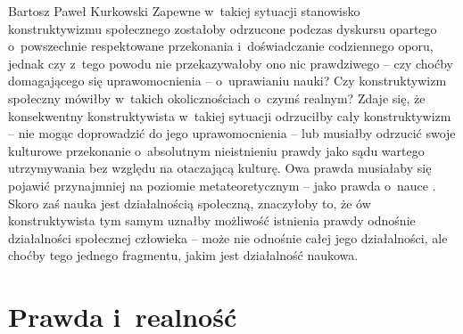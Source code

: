 \begin{artplenv}{Bartosz Paweł Kurkowski}
Zapewne w~takiej sytuacji stanowisko konstruktywizmu społecznego zostałoby odrzucone podczas dyskursu opartego o~powszechnie
respektowane przekonania i~doświadczanie codziennego oporu, jednak czy z~tego powodu nie przekazywałoby ono nic
prawdziwego -- czy choćby domagającego się uprawomocnienia -- o~uprawianiu nauki? Czy konstruktywizm społeczny
mówiłby w~takich okolicznościach o~czymś realnym? Zdaje się, że konsekwentny konstruktywista w~takiej sytuacji odrzuciłby cały
konstruktywizm -- nie mogąc doprowadzić do jego uprawomocnienia -- lub musiałby odrzucić swoje kulturowe
przekonanie o~absolutnym nieistnieniu prawdy jako sądu wartego utrzymywania bez względu na otaczającą kulturę. Owa prawda musiałaby
się pojawić przynajmniej na poziomie metateoretycznym -- jako prawda o~nauce
\parencite[s.~134]{hardt_studia_2013}.
Skoro zaś nauka jest działalnością społeczną, znaczyłoby to, że ów konstruktywista tym samym uznałby
możliwość istnienia prawdy odnośnie działalności społecznej człowieka -- może nie odnośnie całej jego działalności, ale
choćby tego jednego fragmentu, jakim jest działalność naukowa.

\section{Prawda i~realność}


\end{artplenv}
